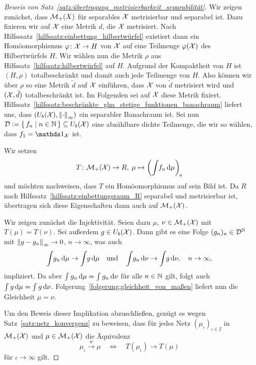 \documentclass[../thesis/thesis.tex]{subfiles}
\begin{document}
	\begin{proof}[Beweis von Satz~\ref{satz:übertragung_metrisierbarkeit_separabilität}]
		Wir zeigen zunächst, dass $\mathcal{M}_{+}(X)$ für separables $\mathcal{X}$ metrisierbar und separabel ist. Dazu fixieren wir auf $\mathcal{X}$ eine Metrik $d$, die $\mathcal{X}$ metrisiert. 
		Nach Hilfsssatz~\ref{hilfssatz:einbettung_hilbertwürfel} existiert dann ein Homöomorphismus $\varphi \colon \mathcal{X} \to H$ von
		$\mathcal{X}$ auf eine Teilmenge $\varphi(\mathcal{X})$ des Hilbertwürfels $H$. Wir wählen nun die Metrik $\rho$ aus Hilfssatz~\ref{hilfssatz:hilbertwürfel} auf $H$. Aufgrund der Kompaktheit von $H$ ist
		$(H, \rho)$ totalbeschränkt und damit auch jede Teilmenge von $H$. Also können wir über $\rho$ so eine Metrik $\tilde{d}$ auf $\mathcal{X}$ einführen, dass $\mathcal{X}$ von $\tilde{d}$ 
		metrisiert wird und $(\mathcal{X}, \tilde{d})$ totalbeschränkt ist. Im Folgenden sei auf $\mathcal{X}$ diese Metrik fixiert. Hilfssatz~\ref{hilfssatz:beschränkte_glm_stetige_funktionen_banachraum} liefert uns, dass 
		$(U_b(\mathcal{X}), \left\lVert\cdot\right\rVert_\infty)$ ein separabler Banachraum ist. Sei nun $\mathcal{D} \vcentcolon = \left\{\, f_n \; \middle| \; n \in \mathbb{N} \,\right\} \subseteq U_b(\mathcal{X})$ eine abzählbare dichte Teilmenge, 
		die wir so wählen, dass $f_1 = \indfct_\X$ ist.
		
		Wir setzen
		\[ T \colon \mathcal{M}_{+}(\mathcal{X}) \to R, \; \mu \mapsto \left( \int_{} \, f_n \, \mathrm{d}\mu \right)_{\! n}  \]
		und möchten nachweisen, dass $T$ ein Homöomorphismus auf sein Bild ist. Da $R$ nach Hilfssatz~\ref{hilfssatz:einbettungsraum_R} separabel und metrisierbar ist, übertragen sich diese Eigenschaften dann auch auf $\mathcal{M}_{+}(\mathcal{X})$.
		
		Wir zeigen zunächst die Injektivität. Seien dazu $\mu$, $\nu \in \mathcal{M}_{+}(\mathcal{X})$ mit $T(\mu) = T(\nu)$. 
		Sei außerdem $g \in U_b(\mathcal{X})$. Dann gibt es eine Folge $(g_n)_n \in \mathcal{D}^{\mathbb{N}}$ mit $\left\lVert g - g_n\right\rVert_\infty \to 0$, $n \to \infty$, was auch 
		\[ \int_{} \, g_n \, \mathrm{d}\mu \to \int_{} \, g \, \mathrm{d}\mu \quad \text{und} \quad \int_{} \, g_n \, \mathrm{d}\nu \to \int_{} \, g \, \mathrm{d}\nu, \quad n \to \infty \text{,} \]
		impliziert. Da aber $\int_{} \, g_n \, \mathrm{d}\mu = \int_{} \, g_n \, \mathrm{d}\nu$ für alle $n \in \mathbb{N}$ gilt, folgt auch $\int_{} \, g \, \mathrm{d}\mu = \int_{} \, g \, \mathrm{d}\nu$.
		Folgerung~\ref{folgerung:gleichheit_von_maßen} liefert nun die Gleichheit $\mu = \nu$.
		
		Um den Beweis dieser Implikation abzuschließen, genügt es wegen Satz~\ref{satz:netz_konvergenz} zu beweisen, dass für jedes Netz $(\mu_\iota)_{\iota \in I}$ in $\mathcal{M}_{+}(\mathcal{X})$ und $\mu \in \mathcal{M}_{+}(\mathcal{X})$ die
		Äquivalenz
		\[ \mu_\iota \xrightarrow{w} \mu \quad \iff \quad T(\mu_\iota) \to T(\mu)  \]
		für $\iota \to \infty$ gilt.
		

\end{proof}
\end{document}
